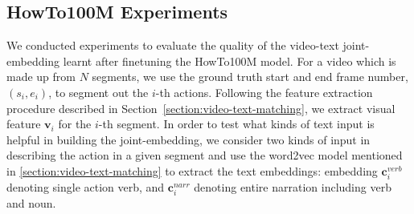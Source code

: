 






\subsection{HowTo100M Experiments} \label{section:howto100m-experiments}
We conducted experiments to evaluate the quality of the video-text joint-embedding learnt after finetuning the HowTo100M model. For a video which is made up from $N$ segments, we use the ground truth start and end frame number, $(s_i,e_i)$, to segment out the $i$-th actions. Following the feature extraction procedure described in Section~\ref{section:video-text-matching}, we extract visual feature $\mathbf{v}_i$ for the $i$-th segment. In order to test what kinds of text input is helpful in building the joint-embedding, we consider two kinds of input in describing the action in a given segment and use the word2vec model mentioned in \ref{section:video-text-matching} to extract the text embeddings: embedding $\mathbf{c}^{verb}_i$ denoting single action verb, and $\mathbf{c}^{narr}_i$ denoting entire narration including verb and noun. 

